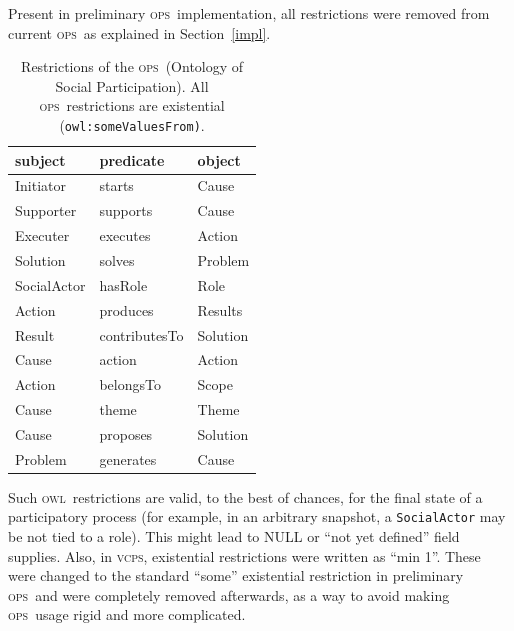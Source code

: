 \documentclass[10pt,letterpaper]{article}
\newcommand{\ops}{\textsc{ops}}
\newcommand{\vcps}{\textsc{vcps}}
\newcommand{\owl}{\textsc{owl}}
\begin{document}
Present in preliminary \ops\ implementation, all restrictions were removed from current \ops\ as explained in Section~\ref{impl}.
\begin{table}[!h]
  \centering
  \caption{Restrictions of the \ops\ (Ontology of Social Participation). All \ops\ restrictions are existential (\texttt{owl:someValuesFrom)}.}
  \begin{tabular}{|l|l|l|}\hline
{\bf subject} & {\bf predicate} & {\bf object} \\\hline\hline
Initiator    & starts        & Cause\\\hline
Supporter    & supports      & Cause\\\hline
Executer     & executes     & Action\\\hline
Solution     & solves      & Problem\\\hline
SocialActor  & hasRole            & Role\\\hline
Action       & produces    & Results\\\hline
Result       & contributesTo   & Solution\\\hline
Cause        & action          & Action\\\hline
Action       & belongsTo     & Scope\\\hline
Cause        & theme           & Theme\\\hline
Cause        & proposes   & Solution\\\hline
Problem      & generates     & Cause\\\hline
  \end{tabular}
  \label{ospRestr}
\end{table}

Such \owl\ restrictions are valid, to the best of chances, for the final state of a participatory process (for example, in an arbitrary snapshot, a \texttt{SocialActor} may be not tied to a role). This might lead to NULL or ``not yet defined'' field supplies.
Also, in \vcps, existential restrictions were  written as ``min 1''. 
These were changed to the standard ``some'' existential restriction in preliminary \ops\ and were completely removed afterwards, as a way to avoid making \ops\ usage rigid and more complicated.
\end{document}

